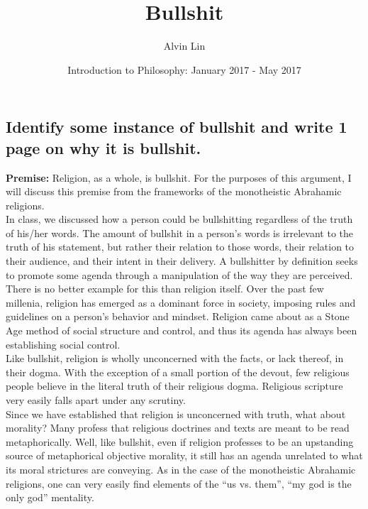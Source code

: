 \documentclass[letterpaper, 12pt]{article}
\title{Bullshit}
\author{Alvin Lin}
\date{Introduction to Philosophy: January 2017 - May 2017}
\begin{document}
\maketitle

\subsection*{Identify some instance of bullshit and write 1 page on why it
is bullshit.}

\textbf{Premise:} Religion, as a whole, is bullshit. For the purposes of this
argument, I will discuss this premise from the frameworks of the monotheistic
Abrahamic religions. \\

In class, we discussed how a person could be bullshitting regardless of the
truth of his/her words. The amount of bullshit in a person's words is irrelevant
to the truth of his statement, but rather their relation to those words, their
relation to their audience, and their intent in their delivery. A bullshitter
by definition seeks to promote some agenda through a manipulation of the
way they are perceived. \\
There is no better example for this than religion itself. Over the past few
millenia, religion has emerged as a dominant force in society, imposing rules
and guidelines on a person's behavior and mindset. Religion came about as a
Stone Age method of social structure and control, and thus its agenda has
always been establishing social control. \\
Like bullshit, religion is wholly unconcerned with the facts, or lack
thereof, in their dogma. With the exception of a small portion of the devout,
few religious people believe in the literal truth of their religious dogma.
Religious scripture very easily falls apart under any scrutiny. \\
Since we have established that religion is unconcerned with truth, what about
morality? Many profess that religious doctrines and texts are meant to be read
metaphorically. Well, like bullshit, even if religion professes to be an upstanding source of metaphorical objective morality, it still has an agenda
unrelated to what its moral strictures are conveying. As in the case of the
monotheistic Abrahamic religions, one can very easily find elements of the ``us
vs. them'', ``my god is the only god'' mentality.
\end{document}
